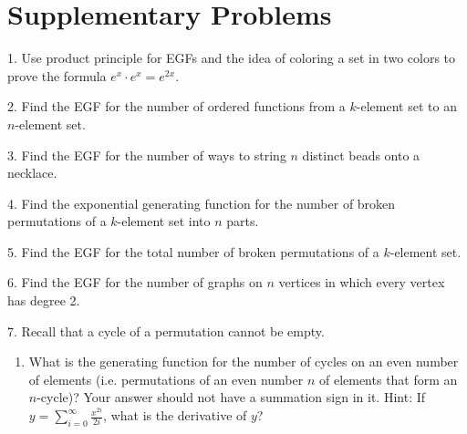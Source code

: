\documentclass[10pt,]{book}
\theoremstyle{plain}
\theoremstyle{definition}
\theoremstyle{definition}
\numberwithin{equation}{chapter}
\begin{document}
\section[{Supplementary Problems}]{Supplementary Problems}\label{app3-suppprobs}
\begin{exerciselist}
\item[1.]\marginsymbol[-1em]{} \hypertarget{exercise-68}{}\hypertarget{p-2222}{}%
Use product principle for EGFs and the idea of coloring a set in two colors to prove the formula \(e^x\cdot e^x = e^{2x}.\)%
\par\smallskip
\item[2.]\marginsymbol[-1em]{} \hypertarget{exercise-69}{}\hypertarget{p-2223}{}%
Find the EGF for the number of ordered functions from a \(k\)-element set to an \(n\)-element set.%
\par\smallskip
\item[3.]\marginsymbol[-1em]{} \hypertarget{exercise-70}{}\hypertarget{p-2224}{}%
Find the EGF for the number of ways to string \(n\) distinct beads onto a necklace.%
\par\smallskip
\item[4.]\marginsymbol[-1em]{} \hypertarget{exercise-71}{}\hypertarget{p-2225}{}%
Find the exponential generating function for the number of broken permutations of a \(k\)-element set into \(n\) parts.%
\par\smallskip
\item[5.]\marginsymbol[-1em]{} \hypertarget{exercise-72}{}\hypertarget{p-2226}{}%
Find the EGF for the total number of broken permutations of a \(k\)-element set.%
\par\smallskip
\item[6.]\marginsymbol[-1em]{} \hypertarget{exercise-73}{}\hypertarget{p-2227}{}%
Find the EGF for the number of graphs on \(n\) vertices in which every vertex has degree 2.%
\par\smallskip
\item[7.]\marginsymbol[-1em]{} \hypertarget{exercise-74}{}\hypertarget{p-2228}{}%
Recall that a cycle of a permutation cannot be empty. \leavevmode%
\begin{enumerate}[label=(\alph*)]
\item\hypertarget{li-140}{}\hypertarget{p-2229}{}%
What is the generating function for the number of cycles on an even number of elements (i.e. permutations of an even number \(n\) of elements that form an \(n\)-cycle)?  Your answer should not have a summation sign in it.  Hint: If \(y=
\sum_{i=0}^\infty \frac{x^{2i}}{2i}\), what is the derivative of \(y\)?%

\end{enumerate}
\end{exerciselist}
\end{document}
